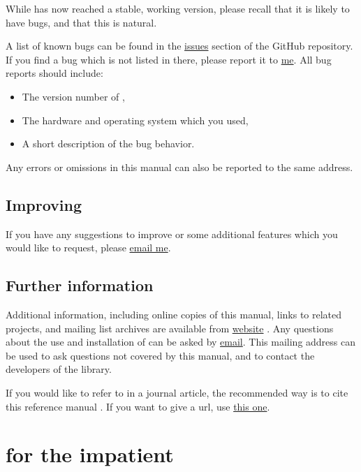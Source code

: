 \documentclass{ol-softwaremanual}
\begin{document}
While \thel has now reached a stable, working version, please recall that it is likely to have bugs, and that this is natural. 

A list of known bugs can be found in the \href{\issuesurl}{issues} section of the GitHub repository.
If you find a bug which is not listed in there, please report it to \href{mailto:michele.castellana@gmail.com}{me}. All bug reports should include:
\begin{itemize}
    \item The version number of \thel, 
    \item The hardware and operating system which you used, 
    \item A short description of the bug behavior. 

\end{itemize}

Any errors or omissions in this manual can also be reported to the same address.

\subsection{Improving \thel}

If you have any suggestions to improve \thel or some additional features which you would like to request, please \href{\contactemail}{email me}. 

\subsection{Further information}


Additional information, including online copies of this manual, links to related projects, and mailing list archives are available from \thel \href{\thelemacusurl}{website}  .
Any questions about the use and installation of \thel can be asked by \href{\contactemail}{email}. This mailing address can be used to ask questions not covered by this manual, and to contact the developers of the library.

If you would like to refer to \thel in a journal article, the recommended way is to cite this reference manual \cite{castellana2024thelemacus-documentation}. If you want to give a url, use  \href{\thelemacusurl}{this one}. 


\section{\thel for the impatient}
\end{document}
